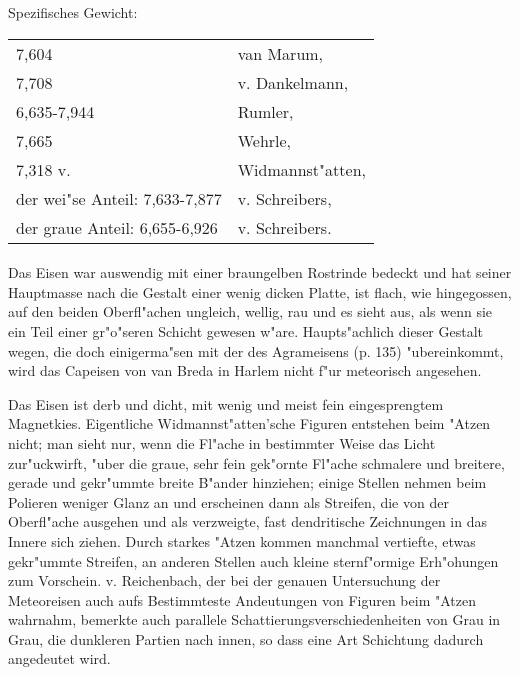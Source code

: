 \documentclass[a4paper, 11pt, oneside]{article}
\begin{document}
Spezifisches Gewicht:  
\begin{table}[!ht]
    \centering
    \begin{tabular}{l l}
        7,604 & van Marum,\\
        7,708 & v. Dankelmann,\\
        6,635-7,944 & Rumler,\\
        7,665 & Wehrle,\\
        7,318 v. & Widmannst"atten,\\
        der wei"se Anteil: 7,633-7,877 & v. Schreibers,\\
        der graue Anteil: 6,655-6,926 & v. Schreibers.
    \end{tabular}
\end{table}
\paragraph{}
Das Eisen war auswendig mit einer braungelben Rostrinde bedeckt und hat seiner Hauptmasse nach die Gestalt einer wenig dicken Platte, ist flach, wie hingegossen, auf den beiden Oberfl"achen ungleich, wellig, rau und es sieht aus, als wenn sie ein Teil einer gr"o"seren Schicht gewesen w"are. Haupts"achlich dieser Gestalt wegen, die doch einigerma"sen mit der des Agrameisens (p. 135) "ubereinkommt, wird das Capeisen von van Breda in Harlem nicht f"ur meteorisch angesehen.

Das Eisen ist derb und dicht, mit wenig und meist fein eingesprengtem Magnetkies. Eigentliche Widmannst"atten'sche Figuren entstehen beim "Atzen nicht; man sieht nur, wenn die Fl"ache in bestimmter Weise das Licht zur"uckwirft, "uber die graue, sehr fein gek"ornte Fl"ache schmalere und breitere, gerade und gekr"ummte breite B"ander hinziehen; einige Stellen nehmen beim Polieren weniger Glanz an und erscheinen dann als Streifen, die von der Oberfl"ache ausgehen und als verzweigte, fast dendritische Zeichnungen in das Innere sich ziehen. Durch starkes "Atzen kommen manchmal vertiefte, etwas gekr"ummte Streifen, an anderen Stellen auch kleine sternf"ormige Erh"ohungen zum Vorschein. v. Reichenbach, der bei der genauen Untersuchung der Meteoreisen auch aufs Bestimmteste Andeutungen von Figuren beim "Atzen wahrnahm, bemerkte auch parallele Schattierungsverschiedenheiten von Grau in Grau, die dunkleren Partien nach innen, so dass eine Art Schichtung dadurch angedeutet wird.
\end{document}
